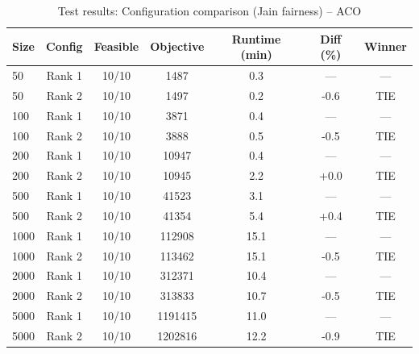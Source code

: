 \begin{table}[htbp]
\centering
\caption{Test results: Configuration comparison (Jain fairness) -- ACO}
\label{tab:test_config_comparison_aco}
\small
\begin{tabular}{lcccccc}
\toprule
\textbf{Size} & \textbf{Config} & \textbf{Feasible} & \textbf{Objective} & \textbf{Runtime (min)} & \textbf{Diff (\%)} & \textbf{Winner} \\
\midrule
50 & Rank 1 & 10/10 & 1487 & 0.3 & --- & ---\\
50 & Rank 2 & 10/10 & 1497 & 0.2 & -0.6 & TIE\\
\midrule
100 & Rank 1 & 10/10 & 3871 & 0.4 & --- & ---\\
100 & Rank 2 & 10/10 & 3888 & 0.5 & -0.5 & TIE\\
\midrule
200 & Rank 1 & 10/10 & 10947 & 0.4 & --- & ---\\
200 & Rank 2 & 10/10 & 10945 & 2.2 & +0.0 & TIE\\
\midrule
500 & Rank 1 & 10/10 & 41523 & 3.1 & --- & ---\\
500 & Rank 2 & 10/10 & 41354 & 5.4 & +0.4 & TIE\\
\midrule
1000 & Rank 1 & 10/10 & 112908 & 15.1 & --- & ---\\
1000 & Rank 2 & 10/10 & 113462 & 15.1 & -0.5 & TIE\\
\midrule
2000 & Rank 1 & 10/10 & 312371 & 10.4 & --- & ---\\
2000 & Rank 2 & 10/10 & 313833 & 10.7 & -0.5 & TIE\\
\midrule
5000 & Rank 1 & 10/10 & 1191415 & 11.0 & --- & ---\\
5000 & Rank 2 & 10/10 & 1202816 & 12.2 & -0.9 & TIE\\
\bottomrule
\end{tabular}
\end{table}